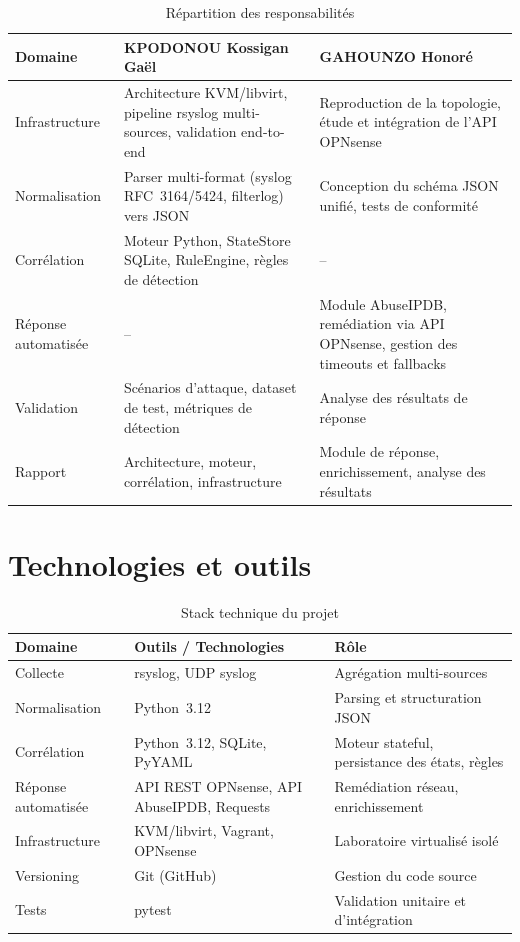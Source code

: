 \documentclass[a4paper,12pt]{article}
\begin{document}
\begin{table}[H]
\centering
\small
\renewcommand{\arraystretch}{1.4}
\begin{tabular}{|p{}|p{}|p{}|}
\hline
\textbf{Domaine} & \textbf{KPODONOU Kossigan Gaël} & \textbf{GAHOUNZO Honoré} \\
\hline
Infrastructure &
Architecture KVM/libvirt, pipeline rsyslog multi-sources, validation end-to-end &
Reproduction de la topologie, étude et intégration de l'API OPNsense \\
\hline
Normalisation &
Parser multi-format (syslog RFC~3164/5424, filterlog) vers JSON &
Conception du schéma JSON unifié, tests de conformité \\
\hline
Corrélation &
Moteur Python, StateStore SQLite, RuleEngine, règles de détection &
-- \\
\hline
Réponse automatisée &
-- &
Module AbuseIPDB, remédiation via API OPNsense, gestion des timeouts et fallbacks \\
\hline
Validation &
Scénarios d'attaque, dataset de test, métriques de détection &
Analyse des résultats de réponse \\
\hline
Rapport &
Architecture, moteur, corrélation, infrastructure &
Module de réponse, enrichissement, analyse des résultats \\
\hline
\end{tabular}
\caption*{Répartition des responsabilités}
\end{table}

\section{Technologies et outils}

\begin{table}[H]
\centering
\small
\renewcommand{\arraystretch}{1.4}
\begin{tabular}{|p{}|p{}|p{}|}
\hline
\textbf{Domaine} & \textbf{Outils / Technologies} & \textbf{Rôle} \\
\hline
Collecte & rsyslog, UDP syslog & Agrégation multi-sources \\
\hline
Normalisation & Python~3.12 & Parsing et structuration JSON \\
\hline
Corrélation & Python~3.12, SQLite, PyYAML & Moteur stateful, persistance des états, règles \\
\hline
Réponse automatisée & API REST OPNsense, API AbuseIPDB, Requests & Remédiation réseau, enrichissement \\
\hline
Infrastructure & KVM/libvirt, Vagrant, OPNsense & Laboratoire virtualisé isolé \\
\hline
Versioning & Git (GitHub) & Gestion du code source \\
\hline
Tests & pytest & Validation unitaire et d'intégration \\
\hline
\end{tabular}
\caption*{Stack technique du projet}
\end{table}
\end{document}
